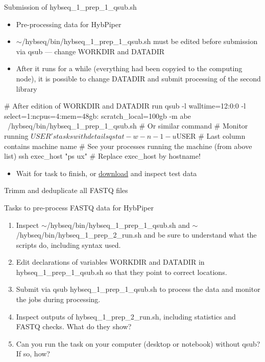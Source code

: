 \documentclass[compress, ucs, xelatex, 11pt, xcolor=x11names, aspectratio=169,
	hyperref={
		bookmarks=true,
		unicode=true,
		colorlinks=true,
		pdftitle={HybSeq course},
		plainpages=false,
		pdfauthor={Vojtech Zeisek},
		pdfsubject={Practical processing of HybSeq target enrichment sequencing data on computing grids like MetaCentrum},
		pdfcreator={XeLaTeX},
		pdfkeywords={BASH, command line, GNU, HybSeq, Linux, MetaCentrum, sequencing shell, target enrichment},
		linkcolor=Turquoise4, %
		anchorcolor=DodgerBlue4, %
		citecolor=DodgerBlue4, %
		filecolor=DodgerBlue4, %
		menucolor=Tan4, %
		urlcolor=DarkOliveGreen4, %
		pdftex},
	url={hyphens, lowtilde} %
	]{beamer}
\renewcommand{\texttt}[1]{\colorbox{Cornsilk2}{{\ttfamily #1}}}
\renewcommand{\alert}[1]{\textcolor{OrangeRed3}{#1}}
\begin{document}
\begin{frame}[fragile]{Submission of hybseq\_1\_prep\_1\_qsub.sh}
	\begin{itemize}
		\item Pre-processing data for HybPiper
		\item \alert{\texttt{$\sim$/hybseq/bin/hybseq\_1\_prep\_1\_qsub.sh} must be edited before submission via \texttt{qsub} --- change \texttt{WORKDIR} and \texttt{DATADIR}}
		\item After it runs for a while (everything had been copyied to the computing node), it is possible to change \texttt{DATADIR} and submit processing of the second library
	\end{itemize}
	\begin{bashcode}
    # After edition of WORKDIR and DATADIR run
    qsub -l walltime=12:0:0 -l select=1:ncpus=4:mem=48gb:
      scratch_local=100gb -m abe ~/hybseq/bin/hybseq_1_prep_1_qsub.sh
    # Or similar command
    # Monitor running $USER's tasks with details
    qstat -w -n -1 -u $USER # Last column contains machine name
    # See your processes running the machine (from above list)
    ssh exec_host "ps ux" # Replace exec_host by hostname!
	\end{bashcode}
	\begin{itemize}
		\item Wait for task to finish, or \href{https://botany.natur.cuni.cz/zeisek/hybseq_course_zingibers_1_prepared.zip}{download} and inspect test data
	\end{itemize}
\end{frame}

\begin{frame}{Trimm and deduplicate all FASTQ files}
	\begin{exampleblock}{Tasks to pre-process FASTQ data for HybPiper}
			\begin{enumerate}
				\item Inspect \texttt{$\sim$/hybseq/bin/hybseq\_1\_prep\_1\_qsub.sh} and \texttt{$\sim$/hybseq/bin/hybseq\_1\_prep\_2\_run.sh} and be sure to understand what the scripts do, including syntax used.
				\item Edit declarations of variables \texttt{WORKDIR} and \texttt{DATADIR} in \texttt{hybseq\_1\_prep\_1\_qsub.sh} so that they point to correct locations.
				\item Submit via \texttt{qsub} \texttt{hybseq\_1\_prep\_1\_qsub.sh} to process the data and monitor the jobs during processing.
				\item Inspect outputs of \texttt{hybseq\_1\_prep\_2\_run.sh}, including statistics and FASTQ checks. What do they show?
				\item Can you run the task on your computer (desktop or notebook) without \texttt{qsub}? If so, how?
		\end{enumerate}
	\end{exampleblock}
\end{frame}
\end{document}

